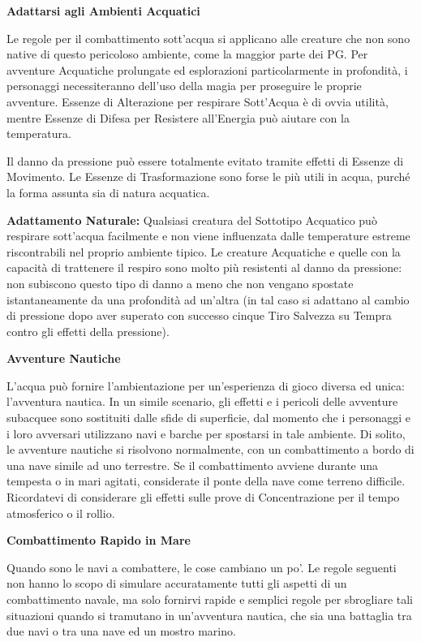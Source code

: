 \documentclass[a4paper,11pt,twoside,openany]{book}
\begin{document}
\textbf{Adattarsi agli Ambienti Acquatici}

Le regole per il combattimento sott'acqua si applicano alle creature che non sono native di questo pericoloso ambiente, come la maggior parte dei PG. Per avventure Acquatiche prolungate ed esplorazioni particolarmente in profondità, i personaggi necessiteranno dell'uso della magia per proseguire le proprie avventure. Essenze di Alterazione per respirare Sott'Acqua è di ovvia utilità, mentre Essenze di Difesa per Resistere all'Energia può aiutare con la temperatura.

Il danno da pressione può essere totalmente evitato tramite effetti di Essenze di Movimento. Le Essenze di Trasformazione sono forse le più utili in acqua, purché la forma assunta sia di natura acquatica.

\textbf{Adattamento Naturale:} Qualsiasi creatura del Sottotipo Acquatico può respirare sott'acqua facilmente e non viene influenzata dalle temperature estreme riscontrabili nel proprio ambiente tipico. Le creature Acquatiche e quelle con la capacità di trattenere il respiro sono molto più resistenti al danno da pressione: non subiscono questo tipo di danno a meno che non vengano spostate istantaneamente da una profondità ad un'altra (in tal caso si adattano al cambio di pressione dopo aver superato con successo cinque Tiro Salvezza su Tempra contro gli effetti della pressione).

\textbf{Avventure Nautiche}

L'acqua può fornire l'ambientazione per un'esperienza di gioco diversa ed unica: l'avventura nautica. In un simile scenario, gli effetti e i pericoli delle avventure subacquee sono sostituiti dalle sfide di superficie, dal momento che i personaggi e i loro avversari utilizzano navi e barche per spostarsi in tale ambiente. Di solito, le avventure nautiche si risolvono normalmente, con un combattimento a bordo di una nave simile ad uno terrestre. Se il combattimento avviene durante una tempesta o in mari agitati, considerate il ponte della nave come terreno difficile. Ricordatevi di considerare gli effetti sulle prove di Concentrazione per il tempo atmosferico o il rollio.

\textbf{Combattimento Rapido in Mare}

Quando sono le navi a combattere, le cose cambiano un po'. Le regole seguenti non hanno lo scopo di simulare accuratamente tutti gli aspetti di un combattimento navale, ma solo fornirvi rapide e semplici regole per sbrogliare tali situazioni quando si tramutano in un'avventura nautica, che sia una battaglia tra due navi o tra una nave ed un mostro marino.
\end{document}
